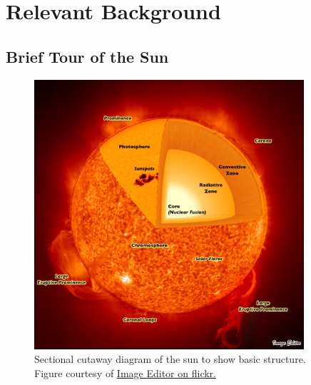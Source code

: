 \chapter{Relevant Background}
\label{chapterbackground}

\section{Brief Tour of the Sun}

\begin{figure}[!h]
    \begin{center}
	    \includegraphics[width=100mm]{Images/SunStructureCutAway.png}
    \end{center}
    \caption[Sun Structure Cutaway]{
        Sectional cutaway diagram of the sun to show basic structure. 
        Figure courtesy of 
        \href{https://www.flickr.com/photos/11304375@N07/2819311727/}{Image Editor on flickr.}
    }
    \label{fig:suncutaway}
\end{figure}

